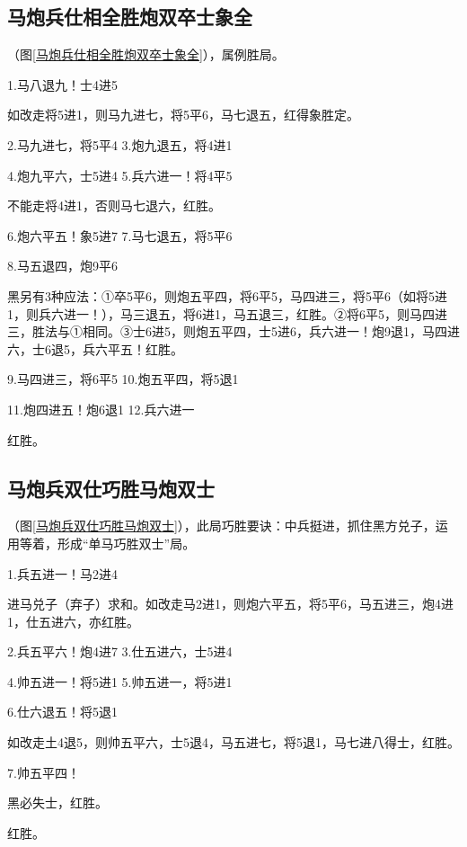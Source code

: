 \documentclass[UTF8]{ctexbook}
\begin{document}
\subsection{马炮兵仕相全胜炮双卒士象全}
（图\ref{马炮兵仕相全胜炮双卒士象全}），属例胜局。

1.马八退九！士4进5

如改走将5进1，则马九进七，将5平6，马七退五，红得象胜定。

2.马九进七，将5平4 \qquad 3.炮九退五，将4进1

4.炮九平六，士5进4 \qquad 5.兵六进一！将4平5

不能走将4进1，否则马七退六，红胜。

6.炮六平五！象5进7 \qquad 7.马七退五，将5平6

8.马五退四，炮9平6

黑另有3种应法：①卒5平6，则炮五平四，将6平5，马四进三，将5平6（如将5进1，则兵六进一！），马三退五，将6进1，马五退三，红胜。②将6平5，则马四进三，胜法与①相同。③士6进5，则炮五平四，士5进6，兵六进一！炮9退1，马四进六，士6退5，兵六平五！红胜。

9.马四进三，将6平5 \qquad 10.炮五平四，将5退1

11.炮四进五！炮6退1 \qquad 12.兵六进一

红胜。

\subsection{马炮兵双仕巧胜马炮双士}
（图\ref{马炮兵双仕巧胜马炮双士}），此局巧胜要诀：中兵挺进，抓住黑方兑子，运用等着，形成“单马巧胜双士”局。

1.兵五进一！马2进4

进马兑子（弃子）求和。如改走马2进1，则炮六平五，将5平6，马五进三，炮4进1，仕五进六，亦红胜。

2.兵五平六！炮4进7 \qquad 3.仕五进六，士5进4

4.帅五进一！将5进1 \qquad 5.帅五进一，将5进1

6.仕六退五！将5退1

如改走土4退5，则帅五平六，士5退4，马五进七，将5退1，马七进八得士，红胜。

7.帅五平四！

黑必失士，红胜。

红胜。
\end{document}
